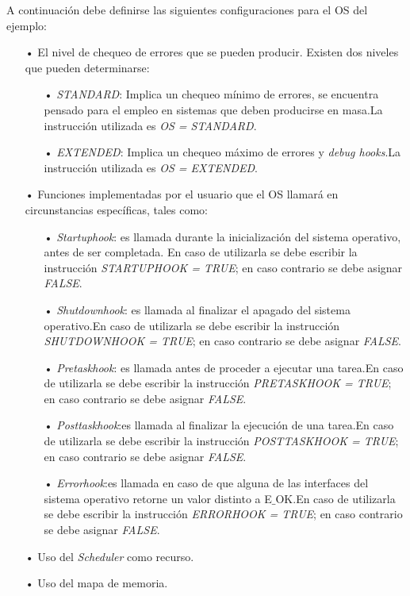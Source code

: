 \documentclass[12pt,letterpaper]{article}
\begin{document}
A continuación debe definirse las siguientes configuraciones para el OS del ejemplo:

\begin{enumerate}
\item[•]El nivel de chequeo de errores que se pueden producir. Existen dos niveles que pueden determinarse:
\begin{enumerate}
\item[•]\textit{STANDARD}: Implica un chequeo mínimo de errores, se encuentra pensado para el empleo en sistemas que deben producirse en masa.La instrucción utilizada es \textit{OS = STANDARD}. 
\item[•]\textit{EXTENDED}: Implica un chequeo máximo de errores y \textit{debug hooks}.La instrucción utilizada es \textit{OS = EXTENDED}.
\end{enumerate}
\item[•]Funciones implementadas por el usuario que el OS llamará en circunstancias específicas, tales como:
\begin{enumerate}
\item[•]\textit{Startuphook}: es  llamada  durante  la  inicialización  del  sistema  operativo,  antes  de  ser completada. En caso de utilizarla se debe escribir la instrucción \textit{STARTUPHOOK = TRUE}; en caso contrario se debe asignar \textit{FALSE}.
\item[•]\textit{Shutdownhook}: es llamada al finalizar el apagado del sistema operativo.En caso de utilizarla se debe escribir la instrucción \textit{SHUTDOWNHOOK = TRUE}; en caso contrario se debe asignar \textit{FALSE}.
\item[•]\textit{Pretaskhook}: es llamada antes de proceder a ejecutar una tarea.En caso de utilizarla se debe escribir la instrucción \textit{PRETASKHOOK = TRUE}; en caso contrario se debe asignar \textit{FALSE}.
\item[•]\textit{Posttaskhook}:es llamada al finalizar la ejecución de una tarea.En caso de utilizarla se debe escribir la instrucción \textit{POSTTASKHOOK = TRUE}; en caso contrario se debe asignar \textit{FALSE}.
\item[•]\textit{Errorhook}:es llamada en caso de que alguna de las interfaces del sistema operativo retorne un valor distinto a E$\_$OK.En caso de utilizarla se debe escribir la instrucción \textit{ERRORHOOK = TRUE}; en caso contrario se debe asignar \textit{FALSE}.
\end{enumerate}
\item[•]Uso del \textit{Scheduler} como recurso.
\item[•]Uso del mapa de memoria.
\end{enumerate}
\end{document}
